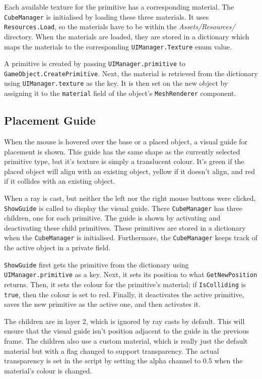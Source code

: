 \documentclass[a4paper, 12pt]{scrartcl}
\begin{document}
Each available texture for the primitive has a corresponding material. The \texttt{CubeManager} is initialised by loading these three materials. It uses \texttt{Resources.Load}, so the materials have to be within the \textit{Assets/Resources/} directory. When the materials are loaded, they are stored in a dictionary which maps the materials to the corresponding \texttt{UIManager.Texture} enum value.

A primitive is created by passing \texttt{UIManager.primitive} to \texttt{GameObject.Create\-Primitive}. Next, the material is retrieved from the dictionary using \texttt{UIManager.texture} as the key. It is then set on the new object by assigning it to the \texttt{material} field of the object's \texttt{MeshRenderer} component.

\subsection{Placement Guide}
When the mouse is hovered over the base or a placed object, a visual guide for placement is shown. This guide has the same shape as the currently selected primitive type, but it's texture is simply a translucent colour. It's green if the placed object will align with an existing object, yellow if it doesn't align, and red if it collides with an existing object.

When a ray is cast, but neither the left nor the right mouse buttons were clicked, \texttt{ShowGuide} is called to display the visual guide. There \texttt{CubeManager} has three children, one for each primitive. The guide is shown by activating and deactivating these child primitives. These primitives are stored in a dictionary when the \texttt{CubeManager} is initialised. Furthermore, the \texttt{CubeManager} keeps track of the active object in a private field.

\texttt{ShowGuide} first gets the primitive from the dictionary using \texttt{UIManager.primitive} as a key. Next, it sets its position to what \texttt{GetNewPosition} returns. Then, it sets the colour for the primitive's material; if \texttt{IsColliding} is \texttt{true}, then the colour is set to red. Finally, it deactivates the active primitive, saves the new primitive as the active one, and then activates it.

The children are in layer 2, which is ignored by ray casts by default. This will ensure that the visual guide isn't position adjacent to the guide in the previous frame. The children also use a custom material, which is really just the default material but with a flag changed to support transparency. The actual transparency is set in the script by setting the alpha channel to 0.5 when the material's colour is changed.
\end{document}
